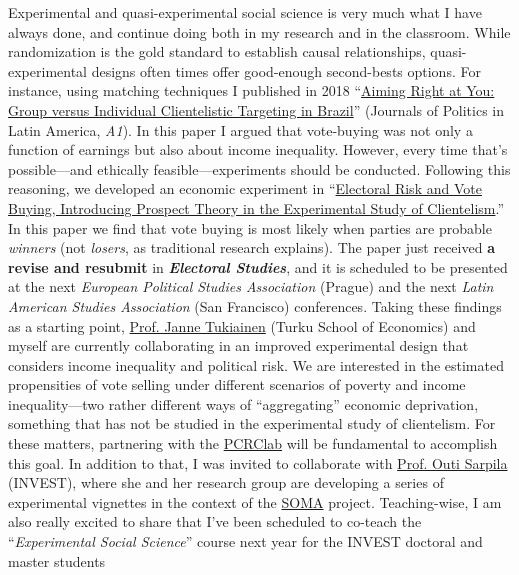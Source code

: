 \documentclass[10pt,stdletter,dateno,sigleft]{newlfm} %
\begin{document}
\begin{newlfm}
Experimental and quasi-experimental social science is very much what I have always done, and continue doing both in my research and in the classroom. While randomization is the gold standard to establish causal relationships, quasi-experimental designs often times offer good-enough second-bests options. For instance, using matching techniques I published in 2018 ``\href{https://journals.sub.uni-hamburg.de/giga/jpla/article/view/1121/1128}{Aiming Right at You: Group versus Individual Clientelistic Targeting in Brazil}'' (Journals of Politics in Latin America, \emph{A1}). In this paper I argued that vote-buying was not only a function of earnings but also about income inequality. However, every time that's possible---and ethically feasible---experiments should be conducted. Following this reasoning, we developed an economic experiment in ``\href{https://github.com/hbahamonde/Economic_Experiment_Vote_Selling/raw/master/Vote_Selling_Bahamonde_Canales_Paper.pdf}{Electoral Risk and Vote Buying, Introducing Prospect Theory in the Experimental Study of Clientelism}.'' In this paper we find that vote buying is most likely when parties are probable \emph{winners} (not \emph{losers}, as traditional research explains). The paper just received  {\bf a revise and resubmit} in {\bf \emph{Electoral Studies}}, and it is scheduled to be presented at the next \emph{European Political Studies Association} (Prague) and the next \emph{Latin American Studies Association} (San Francisco) conferences. Taking these findings as a starting point, \href{https://www.utu.fi/en/people/janne-tukiainen}{Prof. Janne Tukiainen} (Turku School of Economics) and myself are currently collaborating in an improved experimental design that considers income inequality and political risk. We are interested in the estimated propensities of vote selling under different scenarios of poverty and income inequality---two rather different ways of ``aggregating'' economic deprivation, something that has not be studied in the experimental study of clientelism. For these matters, partnering with the \href{https://pcrclab.utu.fi/?page_id=894&lang=en}{PCRClab} will be fundamental to accomplish this goal. In addition to that, I was invited to collaborate with \href{https://www.utu.fi/en/people/outi-sarpila}{Prof. Outi Sarpila} (INVEST), where she and her research group are developing a series of experimental vignettes in the context of the \href{https://soma.utu.fi}{SOMA} project. Teaching-wise, I am also really excited to share that I've been scheduled to co-teach the ``\emph{Experimental Social Science}'' course next year for the INVEST doctoral and master students


\end{newlfm}
\end{document}
